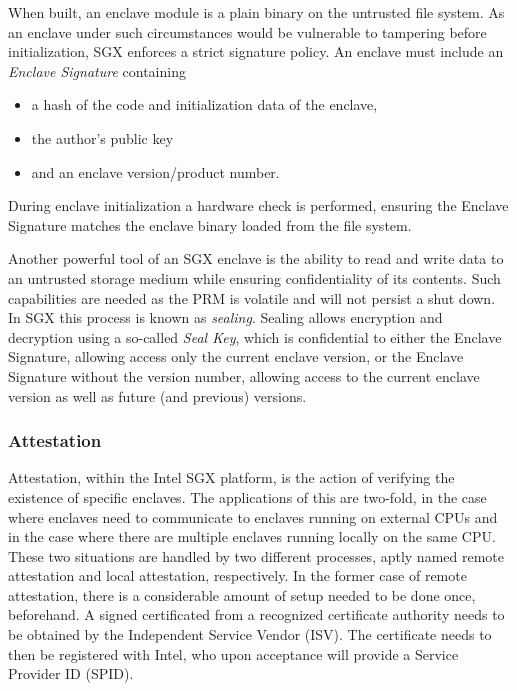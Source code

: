 \documentclass[12pt]{article}
\begin{document}
      When built, an enclave module is a plain binary on the untrusted file system.
      As an enclave under such circumstances would be vulnerable to tampering before initialization, SGX enforces a strict signature policy.
      An enclave must include an \textit{Enclave Signature} containing
      \begin{itemize}
        \item a hash of the code and initialization data of the enclave,
        \item the author's public key
        \item and an enclave version/product number.
      \end{itemize}
      During enclave initialization a hardware check is performed, ensuring the Enclave Signature matches the enclave binary loaded from the file system.

      Another powerful tool of an SGX enclave is the ability to read and write data to an untrusted storage medium while ensuring confidentiality of its contents.
      Such capabilities are needed as the PRM is volatile and will not persist a shut down.
      In SGX this process is known as \textit{sealing}.
      Sealing allows encryption and decryption using a so-called \textit{Seal Key}, which is confidential to either the Enclave Signature, allowing access only the current enclave version, or the Enclave Signature without the version number, allowing access to the current enclave version as well as future (and previous) versions.

			\subsubsection{Attestation}
			Attestation, within the Intel SGX platform, is the action of verifying the existence of specific enclaves.
			The applications of this are two-fold, in the case where enclaves need to communicate to enclaves running on external CPUs and in the case where there are multiple enclaves running locally on the same CPU.
			These two situations are handled by two different processes, aptly named remote attestation and local attestation, respectively.
			In the former case of remote attestation, there is a considerable amount of setup needed to be done once, beforehand.
			A signed certificated from a recognized certificate authority needs to be obtained by the Independent Service Vendor (ISV).
			The certificate needs to then be registered with Intel, who upon acceptance will provide a Service Provider ID (SPID).
\end{document}
